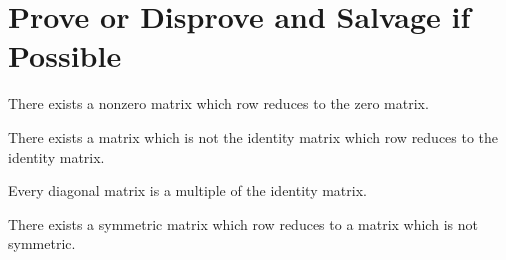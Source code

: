 \documentclass{homework}
\begin{document}
\section{Prove or Disprove and Salvage if Possible}

\begin{problem}
  There exists a nonzero matrix which row reduces to the zero matrix.
\end{problem}

\begin{problem}
  There exists a matrix which is not the identity matrix which row reduces to the identity matrix.
\end{problem}

\begin{problem}
  Every diagonal matrix is a multiple of the identity matrix.
\end{problem}

\begin{problem}
  There exists a symmetric matrix which row reduces to a matrix which
  is not symmetric.
\end{problem}
\end{document}
